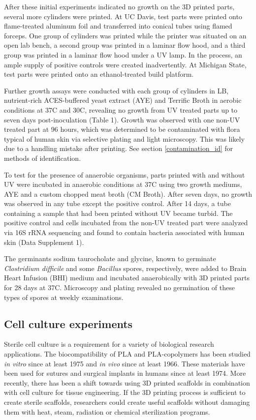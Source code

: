 \documentclass[fleqn,10pt]{wlpeerj}
\begin{document}
After these initial experiments indicated no growth on the 3D printed parts, several more cylinders were printed. At UC Davis, test parts were printed onto flame-treated aluminum foil and transferred into conical tubes using flamed forceps. One group of cylinders was printed while the printer was situated on an open lab bench, a second group was printed in a laminar flow hood, and a third group was printed in a laminar flow hood under a UV lamp. In the process, an ample supply of positive controls were created inadvertently. At Michigan State, test parts were printed onto an ethanol-treated build platform. 

Further growth assays were conducted with each group of cylinders in LB, nutrient-rich ACES-buffered yeast extract (AYE) \cite{AYE_broth} and Terrific Broth in aerobic conditions at 37C and 30C, revealing no growth from UV treated parts up to seven days post-inoculation (Table 1). Growth was observed with one non-UV treated part at 96 hours, which was determined to be contaminated with flora typical of human skin via selective plating and light microscopy. This was likely due to a handling mistake after printing. See section \ref{contamination_id} for methods of identification.
 
To test for the presence of anaerobic organisms, parts printed with and without UV were incubated in anaerobic conditions at 37C using two growth mediums, AYE and a custom chopped meat broth (CM Broth). \cite{seaweed_human_gut} After seven days, no growth was observed in any tube except the positive control. After 14 days, a tube containing a sample that had been printed without UV became turbid. The positive control and cells incubated from the non-UV treated part were analyzed via 16S rRNA sequencing and found to contain bacteria associated with human skin (Data Supplement 1). 

The germinants sodium taurocholate and glycine, known to germinate {\em Clostridium difficile} and some {\em Bacillus} spores, respectively, \cite{spores, spore_germinant_salt} were added to Brain Heart Infusion (BHI) medium and incubated anaerobically with 3D printed parts for 28 days at 37C. Microscopy and plating revealed no germination of these types of spores at weekly examinations.

\subsection{Cell culture experiments}

Sterile cell culture is a requirement for a variety of biological research applications. The biocompatibility of PLA and PLA-copolymers has been studied {\em in vitro} since at least 1975 \cite{PLA_1975} and {\em in vivo} since at least 1966. \cite{PLA_1966} These materials have been used for sutures and surgical implants in humans since at least 1974. \cite{Vicryl} More recently, there has been a shift towards using 3D printed scaffolds in combination with cell culture for tissue engineering. \cite{bone_printing} If the 3D printing process is sufficient to create sterile scaffolds, researchers could create useful scaffolds without damaging them with heat, steam, radiation or chemical sterilization programs.
\end{document}
